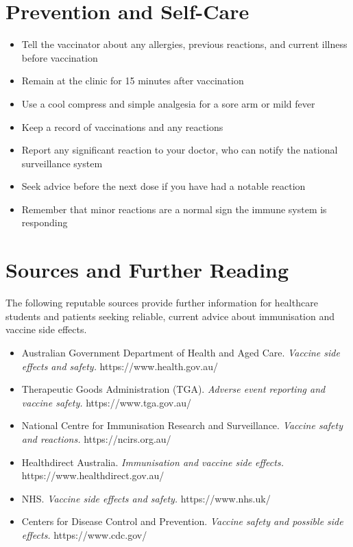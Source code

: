 \section*{Prevention and Self-Care}
\begin{itemize}
    \item Tell the vaccinator about any allergies, previous reactions, and current illness before vaccination
    \item Remain at the clinic for 15 minutes after vaccination
    \item Use a cool compress and simple analgesia for a sore arm or mild fever
    \item Keep a record of vaccinations and any reactions
    \item Report any significant reaction to your doctor, who can notify the national surveillance system
    \item Seek advice before the next dose if you have had a notable reaction
    \item Remember that minor reactions are a normal sign the immune system is responding
\end{itemize}

\section*{Sources and Further Reading}
The following reputable sources provide further information for healthcare students and patients seeking reliable, current advice about immunisation and vaccine side effects.
\begin{itemize}
    \item Australian Government Department of Health and Aged Care. \textit{Vaccine side effects and safety.} https://www.health.gov.au/
    \item Therapeutic Goods Administration (TGA). \textit{Adverse event reporting and vaccine safety.} https://www.tga.gov.au/
    \item National Centre for Immunisation Research and Surveillance. \textit{Vaccine safety and reactions.} https://ncirs.org.au/
    \item Healthdirect Australia. \textit{Immunisation and vaccine side effects.} https://www.healthdirect.gov.au/
    \item NHS. \textit{Vaccine side effects and safety.} https://www.nhs.uk/
    \item Centers for Disease Control and Prevention. \textit{Vaccine safety and possible side effects.} https://www.cdc.gov/
\end{itemize}
